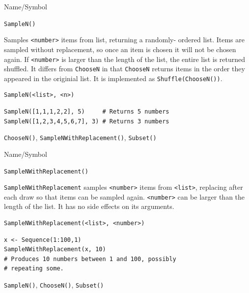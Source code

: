 \begin{desc}{Name/Symbol}
\item[Name/Symbol]  	\verb+SampleN()+

\item[Description] Samples \verb+<number>+ items from list, returning
  a randomly- ordered list. Items are sampled without replacement, so
  once an item is chosen it will not be chosen again. If
  \verb+<number>+ is larger than the length of the list, the entire
  list is returned shuffled.  It differs from \verb+ChooseN+ in that
  \verb+ChooseN+ returns items in the order they appeared in the
  originial list.  It is implemented as \verb+Shuffle(ChooseN())+.

\item[Usage]       	
\begin{verbatim}
SampleN(<list>, <n>)
\end{verbatim}

\item[Example]   	
\begin{verbatim}
SampleN([1,1,1,2,2], 5)     # Returns 5 numbers
SampleN([1,2,3,4,5,6,7], 3) # Returns 3 numbers 
\end{verbatim}

\item[See Also]    	\verb+ChooseN()+, \verb+SampleNWithReplacement()+, \verb+Subset()+
\end{desc}

\begin{desc}{Name/Symbol}
\item[Name/Symbol] 	\verb+SampleNWithReplacement()+

\item[Description] \verb+SampleNWithReplacement+ samples
  \verb+<number>+ items from \verb+<list>+, replacing after each draw
  so that items can be sampled again.  \verb+<number>+ can be larger
  than the length of the list. It has no side effects on its
  arguments.  
\item[Usage]        	
\begin{verbatim}
SampleNWithReplacement(<list>, <number>)
\end{verbatim}

\item[Example] 	
\begin{verbatim}
x <- Sequence(1:100,1)
SampleNWithReplacement(x, 10)
# Produces 10 numbers between 1 and 100, possibly 
# repeating some.
\end{verbatim}

\item[See Also]     	\verb+SampleN()+, \verb+ChooseN()+, \verb+Subset()+
\end{desc}

